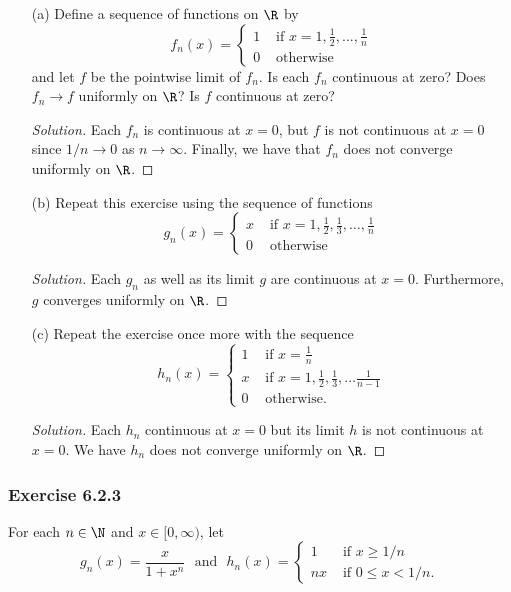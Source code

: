 \begin{enumerate}
    \item[(a)] Define a sequence of functions on \( \R  \) by 
        \[  f_n(x) = 
        \begin{cases}
            1 &\text{~if~} x = 1, \frac{ 1 }{ 2 }, ..., \frac{ 1 }{ n } \\ 
            0 &\text{~otherwise} 
        \end{cases} \]
and let \( f  \) be the pointwise limit of \( f_n \). Is each \( f_n  \) continuous at zero? Does \( f_n \to f  \) uniformly on \( \R  \)? Is \( f  \) continuous at zero? 
\begin{proof}[Solution]
Each \( f_n  \) is continuous at \( x = 0  \), but \( f  \) is not continuous at \( x = 0  \) since \( 1/ n \to 0  \) as \( n \to \infty  \). Finally, we have that \( f_n  \) does not converge uniformly on \( \R  \).
\end{proof}

\item[(b)] Repeat this exercise using the sequence of functions
    \[  g_n(x) = 
    \begin{cases}
        x &\text{~if~} x = 1, \frac{ 1 }{ 2 }, \frac{ 1 }{ 3 }, \dots, \frac{ 1 }{ n } \\
        0 &\text{~otherwise}
    \end{cases} \]
    \begin{proof}[Solution]
    Each \( g_n  \) as well as its limit \( g  \) are continuous at \( x = 0  \). Furthermore, \( g  \) converges uniformly on \( \R  \).
    \end{proof}
\item[(c)] Repeat the exercise once more with the sequence
    \[  h_n(x) = 
    \begin{cases}
        1 &\text{~if~} x = \frac{ 1 }{ n } \\
        x &\text{~if~} x = 1, \frac{ 1 }{ 2 }, \frac{ 1 }{ 3 }, \dots \frac{ 1 }{ n-1  } \\
        0 &\text{~otherwise}.
    \end{cases} \]
    \begin{proof}[Solution]
    Each \( h_n  \) continuous at \( x = 0  \) but its limit \( h  \) is not continuous at \( x = 0  \). We have \( h_n   \) does not converge uniformly on \( \R  \).
    \end{proof} 
\end{enumerate}

\subsubsection{Exercise 6.2.3} For each \( n \in \N  \) and \( x \in [0,\infty ) \), let 
\[  g_n(x) = \frac{ x  }{ 1 + x^n } \text{~ and ~} h_n(x) = 
\begin{cases}
    1 &\text{~if~} x \geq 1 /n \\
    nx &\text{~if~} 0 \leq x < 1 / n.
\end{cases}  \]

